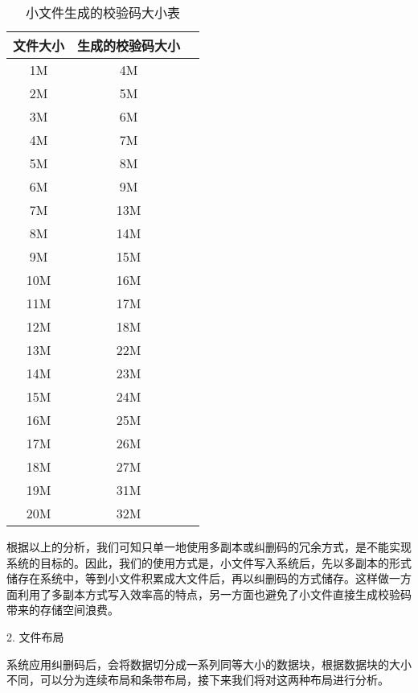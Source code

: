 \begin{table}[h]
  \vspace{10pt}
  \caption{小文件生成的校验码大小表}
  \vspace{-15pt}
  \centering
  \begin{tabular}{ccc}
    \toprule
    文件大小     & 生成的校验码大小 \\
    \midrule
    1M & 4M                     \\
    2M & 5M                     \\
    3M & 6M                     \\
    4M & 7M                     \\
    5M & 8M                     \\
    6M & 9M                     \\
    7M & 13M                     \\
    8M & 14M                     \\
    9M & 15M                     \\
    10M & 16M                     \\
    11M & 17M                     \\
    12M & 18M                     \\
    13M & 22M                     \\
    14M & 23M                     \\
    15M & 24M                     \\
    16M & 25M                     \\
    17M & 26M                     \\
    18M & 27M                     \\
    19M & 31M                     \\
    20M & 32M                     \\
    \bottomrule
  \end{tabular}
\end{table}

根据以上的分析，我们可知只单一地使用多副本或纠删码的冗余方式，是不能实现系统的目标的。因此，我们的使用方式是，小文件写入系统后，先以多副本的形式储存在系统中，等到小文件积累成大文件后，再以纠删码的方式储存。这样做一方面利用了多副本方式写入效率高的特点，另一方面也避免了小文件直接生成校验码带来的存储空间浪费。

2. 文件布局

系统应用纠删码后，会将数据切分成一系列同等大小的数据块，根据数据块的大小不同，可以分为连续布局和条带布局，接下来我们将对这两种布局进行分析。

